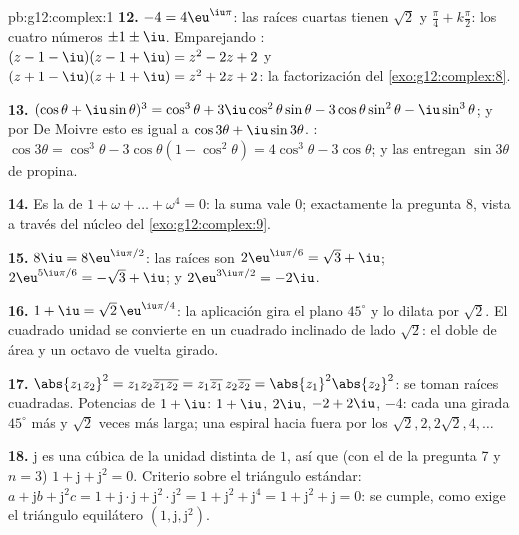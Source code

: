 \begin{solution}{pb:g12:complex:1}
\textbf{12.} $-4 = 4\eu^{\iu\pi}$: las raíces cuartas tienen 
$\sqrt2$ y  $\frac{\pi}{4} + k\frac{\pi}{2}$: los cuatro números
$\pm 1 \pm \iu$. Emparejando :
$(z - 1 - \iu)(z - 1 + \iu) = z^2 - 2z + 2$ y
$(z + 1 - \iu)(z + 1 + \iu) = z^2 + 2z + 2$: la factorización del
\cref{exo:g12:complex:8}.

\textbf{13.} $(\cos\theta + \iu\sin\theta)^3 = \cos^3\theta +
3\iu\cos^2\theta\sin\theta - 3\cos\theta\sin^2\theta - \iu\sin^3\theta$; y
por De Moivre esto es igual a $\cos 3\theta + \iu \sin 3\theta$. :
$\cos 3\theta = \cos^3\theta - 3\cos\theta(1 - \cos^2\theta)
= 4\cos^3\theta - 3\cos\theta$; y las  entregan
$\sin 3\theta$ de propina.

\textbf{14.} Es la  de $1 + \omega + \dots + \omega^4 = 0$: la
suma vale $0$; exactamente la pregunta 8, vista a través del núcleo del
\cref{exo:g12:complex:9}.

\textbf{15.} $8\iu = 8\eu^{\iu\pi/2}$: las raíces son
$2\eu^{\iu\pi/6} = \sqrt3 + \iu$; $2\eu^{5\iu\pi/6} = -\sqrt3 + \iu$; y
$2\eu^{3\iu\pi/2} = -2\iu$.

\textbf{16.} $1 + \iu = \sqrt2\,\eu^{\iu\pi/4}$: la aplicación gira el
plano $45^\circ$ y lo dilata por $\sqrt2$. El cuadrado unidad se convierte
en un cuadrado inclinado de lado $\sqrt2$: el doble de área y un octavo de
vuelta girado.

\textbf{17.} $\abs{z_1 z_2}^2 = z_1 z_2 \overline{z_1 z_2} =
z_1\overline{z_1}\, z_2\overline{z_2} = \abs{z_1}^2\abs{z_2}^2$: se toman
raíces cuadradas. Potencias de $1 + \iu$: $1 + \iu$, $2\iu$, $-2 + 2\iu$,
$-4$: cada una girada $45^\circ$ más y $\sqrt2$ veces más larga; una
espiral hacia fuera por los  $\sqrt2, 2, 2\sqrt2, 4, \dots$

\textbf{18.} $\mathrm{j}$ es una  cúbica de la unidad distinta de $1$,
así que (con el  de la pregunta 7 y $n = 3$)
$1 + \mathrm{j} + \mathrm{j}^2 = 0$. Criterio sobre el triángulo estándar:
$a + \mathrm{j}b + \mathrm{j}^2 c = 1 + \mathrm{j}\cdot\mathrm{j} +
\mathrm{j}^2 \cdot \mathrm{j}^2 = 1 + \mathrm{j}^2 + \mathrm{j}^4 =
1 + \mathrm{j}^2 + \mathrm{j} = 0$: se cumple, como exige el triángulo
equilátero $\left(1, \mathrm{j}, \mathrm{j}^2\right)$.


\end{solution}
